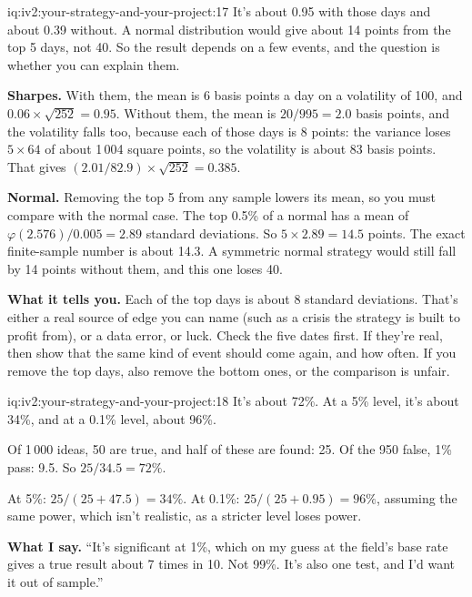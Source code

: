 \begin{solution}{iq:iv2:your-strategy-and-your-project:17}
It's about 0.95 with those days and about 0.39 without. A normal distribution would give about 14 points from the top 5 days, not 40. So the result depends on a few events, and the question is whether you can explain them.

\textbf{Sharpes.} With them, the mean is 6 basis points a day on a volatility of 100, and $0.06 \times \sqrt{252} = 0.95$. Without them, the mean is $20/995 = 2.0$ basis points, and the volatility falls too, because each of those days is 8 points: the variance loses $5 \times 64$ of about 1\,004 square points, so the volatility is about 83 basis points. That gives $(2.01/82.9) \times \sqrt{252} = 0.385$.

\textbf{Normal.} Removing the top 5 from any sample lowers its mean, so you must compare with the normal case. The top 0.5\% of a normal has a mean of $\varphi(2.576)/0.005 = 2.89$ standard deviations. So $5 \times 2.89 = 14.5$ points. The exact finite-sample number is about 14.3. A symmetric normal strategy would still fall by 14 points without them, and this one loses 40.

\textbf{What it tells you.} Each of the top days is about 8 standard deviations. That's either a real source of edge you can name (such as a crisis the strategy is built to profit from), or a data error, or luck. Check the five dates first. If they're real, then show that the same kind of event should come again, and how often. If you remove the top days, also remove the bottom ones, or the comparison is unfair.

\end{solution}

\begin{solution}{iq:iv2:your-strategy-and-your-project:18}
It's about 72\%. At a 5\% level, it's about 34\%, and at a 0.1\% level, about 96\%.

Of 1\,000 ideas, 50 are true, and half of these are found: 25. Of the 950 false, 1\% pass: 9.5. So $25/34.5 = 72\%$.

At 5\%: $25/(25 + 47.5) = 34\%$. At 0.1\%: $25/(25 + 0.95) = 96\%$, assuming the same power, which isn't realistic, as a stricter level loses power.

\textbf{What I say.} ``It's significant at 1\%, which on my guess at the field's base rate gives a true result about 7 times in 10. Not 99\%. It's also one test, and I'd want it out of sample.''

\end{solution}

